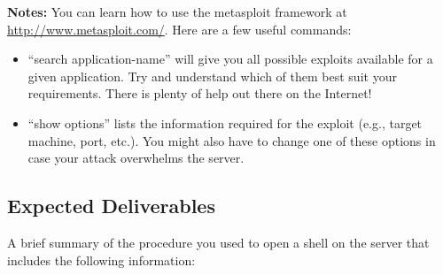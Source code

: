 \documentclass[a4paper,11pt]{article}
\begin{document}
\noindent\textbf{Notes:} You can learn how to use the metasploit framework at
\url{http://www.metasploit.com/}. Here are a few useful commands:
\begin{itemize}
\item ``search application-name'' will give you all possible exploits
  available for a given application. Try and understand which of them
  best suit your requirements. There is plenty of help out there on
  the Internet!
\item ``show options'' lists the information required for the exploit (e.g.,
  target machine, port, etc.). You might also have to change one of these
  options in case your attack overwhelms the server.

\end{itemize}

\subsection{Expected Deliverables}
A brief summary of the procedure you used to open a shell on the
server that includes the following information:
\end{document}
